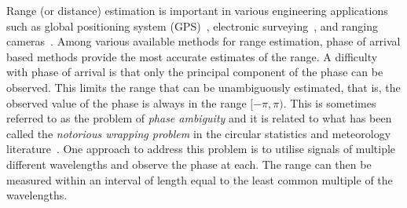 Range (or distance) estimation is important in various engineering applications such as global positioning system (GPS)~\cite{Teunissen_GPS_LAMBDA_2006,Teunissen_GPS_1995}, electronic surveying~\cite{Jacobs_ambiguity_resolution_interferometery_1981, anderson1998surveying}, and ranging cameras~\cite{time_of_flight_cam_continuous_wave_2009,Arrigo_patent_2014}. Among various available methods for range estimation, phase of arrival based methods provide the most accurate estimates of the range. %
A difficulty with phase of arrival is that only the principal component of the phase can be observed.  This limits the range that can be unambiguously estimated, that is, the observed value of the phase is always in the range $[-\pi, \pi)$.  This is sometimes referred to as the problem of \emph{phase ambiguity} and it is related to what has been called the \emph{notorious wrapping problem} in the circular statistics and meteorology literature~\cite{Fisher1993}.  One approach to address this problem is to utilise signals of multiple different wavelengths and observe the phase at each.  The range can then be measured within an interval of length equal to the least common multiple of the wavelengths.  


